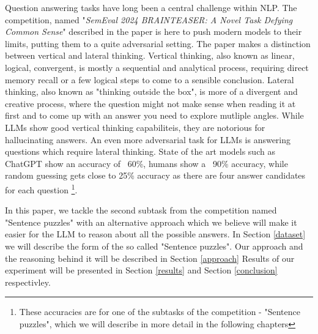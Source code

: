 Question answering tasks have long been a central challenge within NLP.  The competition, named 
"\textit{SemEval 2024 BRAINTEASER: A Novel Task Defying Common Sense}" described in the paper 
\citep{semeval} is here to push modern models to their limits, putting
them to a quite adversarial setting.  The paper makes a distinction between vertical and lateral
thinking.  Vertical thinking, also known as linear, logical, convergent, is mostly a sequential and 
analytical process, requiring direct memory recall or a few logical steps to come to a sensible 
conclusion. Lateral thinking, also known as "thinking outside the box", is more of a divergent
and creative process, where the question might not make sense when reading it at first and to come
up with an answer you need to explore mutliple angles.  While LLMs show good vertical thinking 
capabiliteis, they are notorious for hallucinating answers. An even more adversarial task for
LLMs is answering questions which require lateral thinking.  State of the art models such as 
ChatGPT show an accuracy of ~60\%, humans show a ~90\% accuracy, while random 
guessing gets close to 25\% accuracy as there are four answer candidates for each question
\footnote[1]{These accuracies are
for one of the subtasks of the competition - "Sentence puzzles", which we will describe in more
detail in the following chapters}.

In this paper, we tackle the second subtask from the competition named "Sentence puzzles" with an
alternative approach which we believe will make it easier for the LLM to reason about all the
possible answers. In Section \ref{dataset} we will describe the form of the so called 
"Sentence puzzles".  Our approach and the reasoning behind it will be described in Section 
\ref{approach}  Results of our experiment will be presented in Section \ref{results} and 
Section \ref{conclusion} respectivley.


